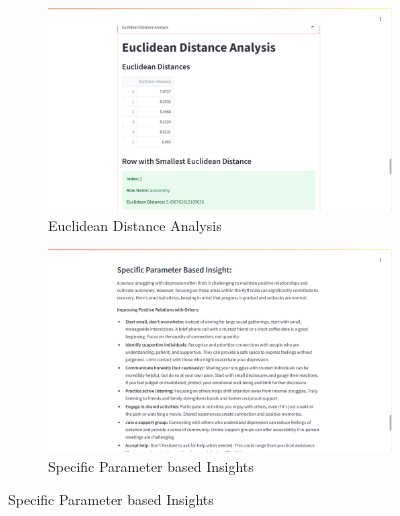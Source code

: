 \begin{figure}[h!]
    \centering
    \begin{subfigure}[b]{0.495\textwidth}
        \centering
        \includegraphics[width=\textwidth]{App Images/24 Interface.png}
        \caption*{Euclidean Distance Analysis}
        \label{fig:euclidean_distance}
    \end{subfigure}
    \hfill
    \begin{subfigure}[b]{0.495\textwidth}
        \centering
        \includegraphics[width=\textwidth]{App Images/25 Interface.png}
        \caption*{Specific Parameter based Insights}
        \label{fig:specific_insights}
    \end{subfigure}
    \label{fig:analysis_comparison}
\end{figure}

\vspace{-2em}

